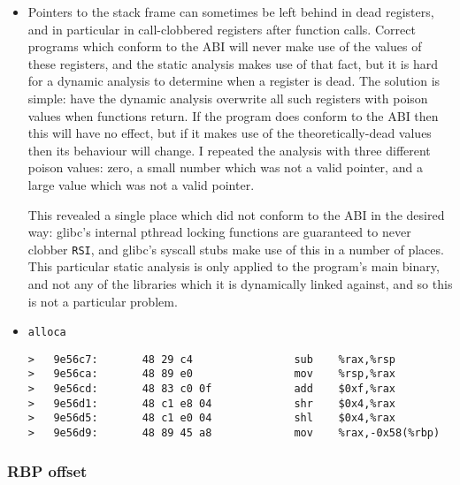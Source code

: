 \begin{itemize}
\item
  Pointers to the stack frame can sometimes be left behind in dead
  registers, and in particular in call-clobbered registers after
  function calls.  Correct programs which conform to the ABI will
  never make use of the values of these registers, and the static
  analysis makes use of that fact, but it is hard for a dynamic
  analysis to determine when a register is dead.  The solution is
  simple: have the dynamic analysis overwrite all such registers with
  poison values when functions return.  If the program does conform to
  the ABI then this will have no effect, but if it makes use of the
  theoretically-dead values then its behaviour will change.  I
  repeated the analysis with three different poison values: zero, a
  small number which was not a valid pointer, and a large value which
  was not a valid pointer.

  This revealed a single place which did not conform to the ABI in the
  desired way: glibc's internal pthread locking functions are
  guaranteed to never clobber \verb|RSI|, and glibc's syscall stubs
  make use of this in a number of places.  This particular static
  analysis is only applied to the program's main binary, and not any
  of the libraries which it is dynamically linked against, and so this
  is not a particular problem.

\item
  \verb|alloca|

\begin{verbatim}
>   9e56c7:       48 29 c4                sub    %rax,%rsp
>   9e56ca:       48 89 e0                mov    %rsp,%rax
>   9e56cd:       48 83 c0 0f             add    $0xf,%rax
>   9e56d1:       48 c1 e8 04             shr    $0x4,%rax
>   9e56d5:       48 c1 e0 04             shl    $0x4,%rax
>   9e56d9:       48 89 45 a8             mov    %rax,-0x58(%rbp)
\end{verbatim}

\end{itemize}

\subsubsection{RBP offset}

